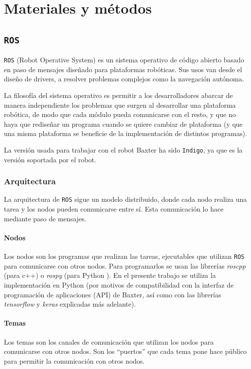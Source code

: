 \chapter{Materiales y métodos}
\newcommand{\ros}{\texttt{ROS} }
\section{\ros}
\ros (Robot Operative System) \cite{ros} es un sistema operativo de código abierto basado en paso de mensajes diseñado para plataformas robóticas. Sus usos van desde el diseño de drivers, a resolver problemas complejos como la navegación autónoma.

La filosofía del sistema operativo es permitir a los desarrolladores abarcar de manera independiente los problemas que surgen al desarrollar una plataforma robótica, de modo que cada módulo pueda comunicarse con el resto, y que no haya que rediseñar un programa cuando se quiere cambiar de plataforma (y que una misma plataforma se beneficie de la implementación de distintos programas).

La versión usada para trabajar con el robot Baxter \cite{baxter} ha sido \texttt{Indigo}, ya que es la versión soportada por el robot.
\subsection{Arquitectura}
La arquitectura de \ros sigue un modelo distribuido, donde cada nodo realiza una tarea y los nodos pueden comunicarse entre sí. Esta comunicación lo hace mediante paso de mensajes.
\subsubsection{Nodos}
Los nodos son los programas que realizan las tareas, ejecutables que utilizan \ros para comunicarse con otros nodos. Para programarlos se usan las librerías \textit{roscpp} (para c++) o \textit{rospy} (para Python \cite{python}). En el presente trabajo se utiliza la implementación en Python (por motivos de compatibilidad con la interfaz de programación de aplicaciones (API) de Baxter, así como con las librerías \textit{tensorflow} \cite{tensorflow} y \textit{keras} \cite{keras} explicadas más adelante).

\subsubsection{Temas}
Los temas son los canales de comunicación que utilizan los nodos para comunicarse con otros nodos. Son los ``puertos'' que cada tema pone hace público para permitir la comunicación con otros nodos.

